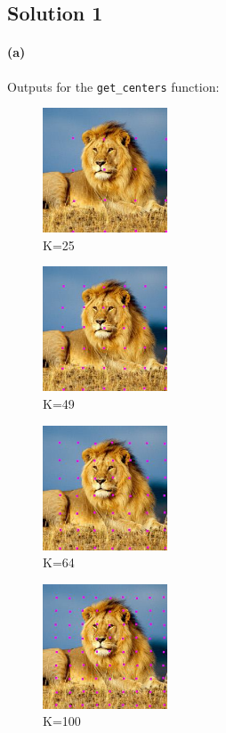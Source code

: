 \documentclass{article}
\newcommand{\solution}[1]{\clearpage \subsection*{Solution #1}}
\newcommand{\spart}[1]{\paragraph{(#1)}}
\begin{document}

\solution{1}

\spart{a} Outputs for the \texttt{get\_centers} function:

\begin{figure}[!h]
  \centering
  \includegraphics[height=10em]{./code/outputs/prob1a_25_centers.jpg}
  \caption{K=25}
\end{figure}

\begin{figure}[!h]
  \centering
  \includegraphics[height=10em]{./code/outputs/prob1a_49_centers.jpg}
  \caption{K=49}
\end{figure}

\begin{figure}[!h]
  \centering
  \includegraphics[height=10em]{./code/outputs/prob1a_64_centers.jpg}
  \caption{K=64}
\end{figure}

\begin{figure}[!h]
  \centering
  \includegraphics[height=10em]{./code/outputs/prob1a_100_centers.jpg}
  \caption{K=100}
\end{figure}
\end{document}
